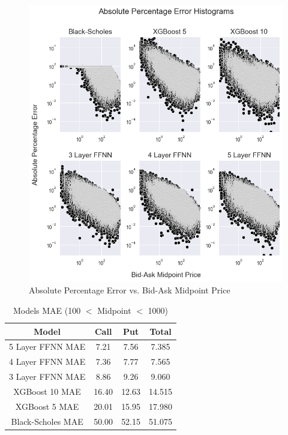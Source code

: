 \documentclass[a4paper]{article}
\begin{document}
\begin{figure}[H]
    \centering
    \includegraphics[width=\linewidth]{APE.png}
    \caption{Absolute Percentage Error vs. Bid-Ask Midpoint Price}
    \label{fig:APE}
  \end{figure}

\begin{table}[htbp]
\centering
\caption{Models MAE (100 $<$ Midpoint $<$ 1000)}
\label{table:modelcomparison_mae_filt}
\begin{tabular}{cccc}
\hline
Model & Call & Put & Total \\
\hline
5 Layer FFNN MAE & 7.21 & 7.56 & 7.385 \\
4 Layer FFNN MAE & 7.36 & 7.77 & 7.565 \\
3 Layer FFNN MAE & 8.86 & 9.26 & 9.060 \\
XGBoost 10 MAE & 16.40 & 12.63 & 14.515 \\
XGBoost 5 MAE & 20.01 & 15.95 & 17.980 \\
Black-Scholes MAE & 50.00 & 52.15 & 51.075 \\
\hline
\end{tabular}
\end{table}
\end{document}

